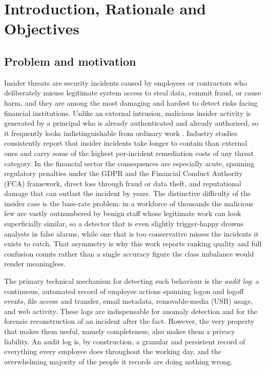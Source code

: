 \documentclass[10pt,a4paper]{article}
\begin{document}
\section{Introduction, Rationale and Objectives}

\subsection{Problem and motivation}
Insider threats are security incidents caused by employees or contractors who deliberately misuse legitimate system access to steal data, commit fraud, or cause harm, and they are among the most damaging and hardest to detect risks facing financial institutions. Unlike an external intrusion, malicious insider activity is generated by a principal who is already authenticated and already authorised, so it frequently looks indistinguishable from ordinary work \cite{homoliak2019,salem2008}. Industry studies consistently report that insider incidents take longer to contain than external ones and carry some of the highest per-incident remediation costs of any threat category. In the financial sector the consequences are especially acute, spanning regulatory penalties under the GDPR and the Financial Conduct Authority (FCA) framework, direct loss through fraud or data theft, and reputational damage that can outlast the incident by years. The distinctive difficulty of the insider case is the base-rate problem: in a workforce of thousands the malicious few are vastly outnumbered by benign staff whose legitimate work can look superficially similar, so a detector that is even slightly trigger-happy drowns analysts in false alarms, while one that is too conservative misses the incidents it exists to catch. That asymmetry is why this work reports ranking quality and full confusion counts rather than a single accuracy figure the class imbalance would render meaningless.

The primary technical mechanism for detecting such behaviour is the \emph{audit log}: a continuous, automated record of employee actions spanning logon and logoff events, file access and transfer, email metadata, removable-media (USB) usage, and web activity. These logs are indispensable for anomaly detection and for the forensic reconstruction of an incident after the fact. However, the very property that makes them useful, namely completeness, also makes them a privacy liability. An audit log is, by construction, a granular and persistent record of everything every employee does throughout the working day, and the overwhelming majority of the people it records are doing nothing wrong.
\end{document}
